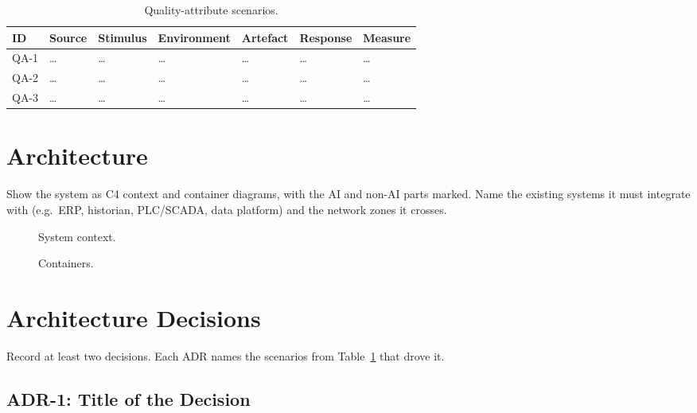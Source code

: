 \documentclass[report]{itvest}
\begin{document}
\begin{table}[h]
  \centering
  \footnotesize
  \begin{tabularx}{\textwidth}{lXXXXXX}
    \toprule
    ID & Source & Stimulus & Environment & Artefact & Response & Measure \\
    \midrule
    QA-1 & \ldots & \ldots & \ldots & \ldots & \ldots & \ldots \\
    QA-2 & \ldots & \ldots & \ldots & \ldots & \ldots & \ldots \\
    QA-3 & \ldots & \ldots & \ldots & \ldots & \ldots & \ldots \\
    \bottomrule
  \end{tabularx}
  \caption{Quality-attribute scenarios.}
  \label{tab:scenarios}
\end{table}

\section{Architecture}

Show the system as C4 context and container diagrams, with the AI and
non-AI parts marked. Name the existing systems it must integrate with
(e.g.\ ERP, historian, PLC/SCADA, data platform) and the network zones
it crosses.

\begin{figure}[h]
  \centering
  \caption{System context.}
  \label{fig:c4-context}
\end{figure}

\begin{figure}[h]
  \centering
  \caption{Containers.}
  \label{fig:c4-container}
\end{figure}

\section{Architecture Decisions}

Record at least two decisions. Each ADR names the scenarios from
Table~\ref{tab:scenarios} that drove it.

\subsection{ADR-1: Title of the Decision}
\end{document}
